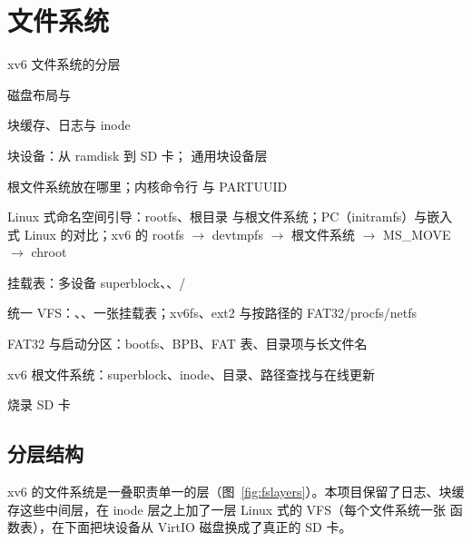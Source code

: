 \chapter{文件系统}
\label{chap:fs}

\begin{introduction}[本章内容]
  \item xv6 文件系统的分层
  \item 磁盘布局与 
  \item 块缓存、日志与 inode
  \item 块设备：从 ramdisk 到 SD 卡； 通用块设备层
  \item 根文件系统放在哪里；内核命令行  与 PARTUUID
  \item Linux 式命名空间引导：rootfs、根目录 \code{/} 与根文件系统；PC（initramfs）与嵌入式 Linux 的对比；xv6 的 rootfs $\to$ devtmpfs $\to$ 根文件系统 $\to$ MS\_MOVE $\to$ chroot
  \item 挂载表：多设备 superblock、、/
  \item 统一 VFS：、、一张挂载表；xv6fs、ext2 与按路径的 FAT32/procfs/netfs
  \item FAT32 与启动分区：bootfs、BPB、FAT 表、目录项与长文件名
  \item xv6 根文件系统：superblock、inode、目录、路径查找与在线更新
  \item 烧录 SD 卡
\end{introduction}

\section{分层结构}

xv6 的文件系统是一叠职责单一的层（图~\ref{fig:fslayers}）。本项目保留了日志、块缓存这些中间层，在 inode 层之上加了一层 Linux 式的 VFS（每个文件系统一张  函数表），在下面把块设备从 VirtIO 磁盘换成了真正的 SD 卡。

